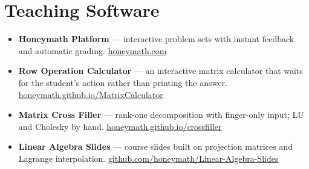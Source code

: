 \documentclass[a4paper,11pt]{article}
\begin{document}
\section{Teaching Software}

\begin{itemize}[label={}]
  \item \textbf{Honeymath Platform} ---
        interactive problem sets with instant feedback and automatic grading.
        \href{https://www.honeymath.com}{honeymath.com}
  \item \textbf{Row Operation Calculator} ---
        an interactive matrix calculator that waits for the student's action
        rather than printing the answer.
        \href{https://honeymath.github.io/MatrixCalculator/}{honeymath.github.io/MatrixCalculator}
  \item \textbf{Matrix Cross Filler} ---
        rank-one decomposition with finger-only input; LU and Cholesky by hand.
        \href{https://honeymath.github.io/crossfiller/}{honeymath.github.io/crossfiller}
  \item \textbf{Linear Algebra Slides} ---
        course slides built on projection matrices and Lagrange interpolation.
        \href{https://github.com/honeymath/Linear-Algebra-Slides}{github.com/honeymath/Linear-Algebra-Slides}
\end{itemize}
\end{document}
